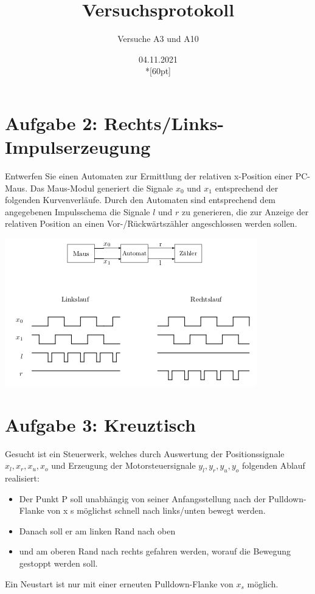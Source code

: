 \documentclass[a4paper,12pt,titlepage]{scrartcl}
\begin{document}
\titlehead
{
    \small
    {
        Technische Universität Ilmenau\\
        Fakulät IA\\
        Fachgebiet Schaltsysteme\\

        Praktikum Schaltsysteme\\
        WS 2021/22}
}

\title {Versuchsprotokoll}
\subtitle{Versuche A3 und A10}
\author{}
\date{04.11.2021\\*[60pt]}
\maketitle

\pagestyle{fancy}
\newpage

\section*{Aufgabe 2: Rechts/Links-Impulserzeugung}
Entwerfen Sie einen Automaten zur Ermittlung der relativen x-Position einer PC-Maus.
Das Maus-Modul generiert die Signale $x_0$ und $x_1$ entsprechend der folgenden Kurvenverläufe.
Durch den Automaten sind entsprechend dem angegebenen Impulsschema die Signale $l$ und $r$ zu generieren, die zur Anzeige der relativen Position an einen Vor-/Rückwärtszähler angeschlossen werden sollen.

\includegraphics{Assets/Schaltsysteme-praktika-v2.png}

\section*{Aufgabe 3: Kreuztisch}
Gesucht ist ein Steuerwerk, welches durch Auswertung der Positionssignale $x_l,x_r,x_u,x_o$ und Erzeugung der Motorsteuersignale $y_l,y_r,y_u,y_o$ folgenden Ablauf realisiert:
\begin{itemize}
    \item Der Punkt P soll unabhängig von seiner Anfangsstellung nach der Pulldown-Flanke von x s
    möglichst schnell nach links/unten bewegt werden.
    \item Danach soll er am linken Rand nach oben
    \item und am oberen Rand nach rechts gefahren werden, worauf die Bewegung gestoppt werden soll.
\end{itemize}
Ein Neustart ist nur mit einer erneuten Pulldown-Flanke von $x_s$ möglich.
\end{document}
